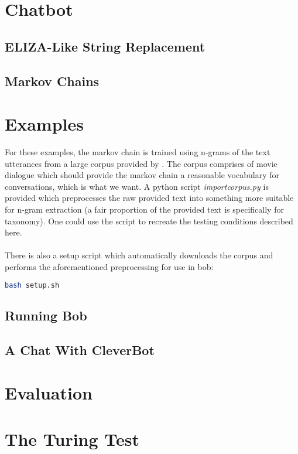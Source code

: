 \documentclass[]{article}
\begin{document}
\section{Chatbot}
\subsection{ELIZA-Like String Replacement}
\cite{Weizenbaum}

\subsection{Markov Chains}

\section{Examples}

For these examples, the markov chain is trained using n-grams of the text utterances from a large corpus provided by \cite{Danescu-Niculescu-Mizil+Lee:11a}. The corpus comprises of movie dialogue which should provide the markov chain a reasonable vocabulary for conversations, which is what we want. A python script \emph{importcorpus.py} is provided which preprocesses the raw provided text into something more suitable for n-gram extraction (a fair proportion of the provided text is specifically for taxonomy). One could use the script to recreate the testing conditions described here.
\\\\
There is also a setup script which automatically downloads the corpus and performs the aforementioned preprocessing for use in bob:
\begin{lstlisting}[language=bash, frame=single]
bash setup.sh
\end{lstlisting}

\subsection{Running Bob}

\subsection{A Chat With CleverBot}

\section{Evaluation}

\section{The Turing Test}
\end{document}
